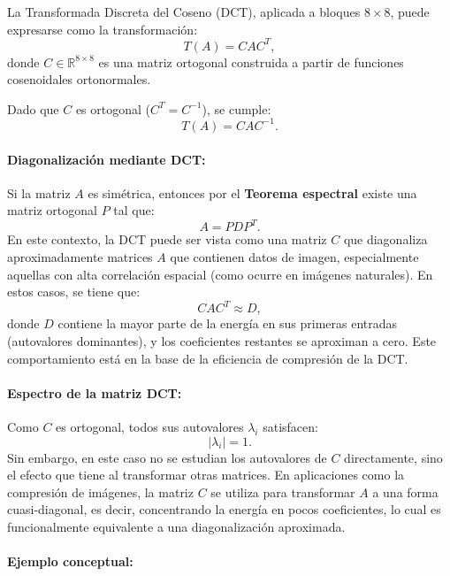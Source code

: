 \documentclass[8pt,a4paper]{article}
\theoremstyle{definition}
\theoremstyle{remark}
\begin{document}
\begin{multicols}{2}
            La Transformada Discreta del Coseno (DCT), aplicada a bloques \( 8 \times 8 \), puede expresarse como la transformación:
            \[
            T(A) = C A C^T,
            \]
            donde \( C \in \mathbb{R}^{8 \times 8} \) es una matriz ortogonal construida a partir de funciones cosenoidales ortonormales.
            
            Dado que \( C \) es ortogonal (\( C^T = C^{-1} \)), se cumple:
            \[
            T(A) = C A C^{-1}.
            \]

            \paragraph{Diagonalización mediante DCT:}
            
            Si la matriz \( A \) es simétrica, entonces por el \textbf{Teorema espectral} existe una matriz ortogonal \( P \) tal que:
            \[
            A = P D P^T.
            \]
            En este contexto, la DCT puede ser vista como una matriz \( C \) que diagonaliza aproximadamente matrices \( A \) que contienen datos de imagen, especialmente aquellas con alta correlación espacial (como ocurre en imágenes naturales). En estos casos, se tiene que:
            \[
            C A C^T \approx D,
            \]
            donde \( D \) contiene la mayor parte de la energía en sus primeras entradas (autovalores dominantes), y los coeficientes restantes se aproximan a cero. Este comportamiento está en la base de la eficiencia de compresión de la DCT.
            
            \paragraph{Espectro de la matriz DCT:}
            
            Como \( C \) es ortogonal, todos sus autovalores \( \lambda_i \) satisfacen:
            \[
            |\lambda_i| = 1.
            \]
            Sin embargo, en este caso no se estudian los autovalores de \( C \) directamente, sino el efecto que tiene al transformar otras matrices. En aplicaciones como la compresión de imágenes, la matriz \( C \) se utiliza para transformar \( A \) a una forma cuasi-diagonal, es decir, concentrando la energía en pocos coeficientes, lo cual es funcionalmente equivalente a una diagonalización aproximada.
            
            \paragraph{Ejemplo conceptual:}
            

\end{multicols}
\end{document}
